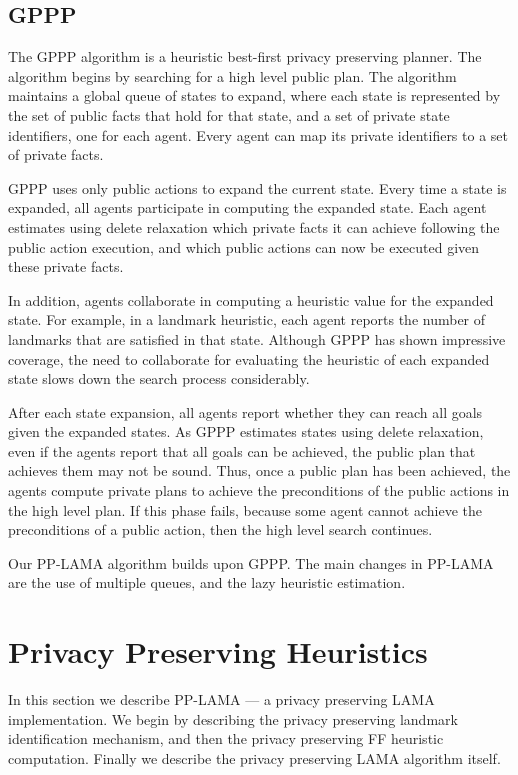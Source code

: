 \documentclass[letterpaper]{article}
\theoremstyle{definition}
\begin{document}
\subsection{GPPP}

The GPPP algorithm \citep{maliah2014privacyPreserving} is a heuristic best-first privacy preserving planner. The algorithm begins by searching for a high level public plan. The algorithm maintains a global queue of states to expand, where each state is represented by the set of public facts that hold for that state, and a set of private state identifiers, one for each agent. Every agent can map its private identifiers to a set of private facts.

GPPP uses only public actions to expand the current state. Every time a state is expanded, all agents participate in computing the expanded state. Each agent estimates using delete relaxation which private facts it can achieve following the public action execution, and which public actions can now be executed given these private facts. 


In addition, agents collaborate in computing a heuristic value for the expanded state. For example, in a landmark heuristic, each agent reports the number of landmarks that are satisfied in that state. Although GPPP has shown impressive coverage, the need to collaborate for evaluating the heuristic of each expanded state slows down the search process considerably.

After each state expansion, all agents report whether they can reach all goals given the expanded states. As GPPP estimates states using delete relaxation, even if the agents report that all goals can be achieved, the public plan that achieves them may not be sound. Thus, once a public plan has been achieved, the agents compute private plans to achieve the preconditions of the public actions in the high level plan. If this phase fails, because some agent cannot achieve the preconditions of a public action, then the high level search continues.

Our PP-LAMA algorithm builds upon GPPP. The main changes in PP-LAMA are the use of multiple queues, and the lazy heuristic estimation.

\section{Privacy Preserving Heuristics}

In this section we describe PP-LAMA --- a privacy preserving LAMA implementation. We begin by describing the privacy preserving landmark identification mechanism, and then the privacy preserving FF heuristic computation. Finally we describe the privacy preserving LAMA algorithm itself.
\end{document}
